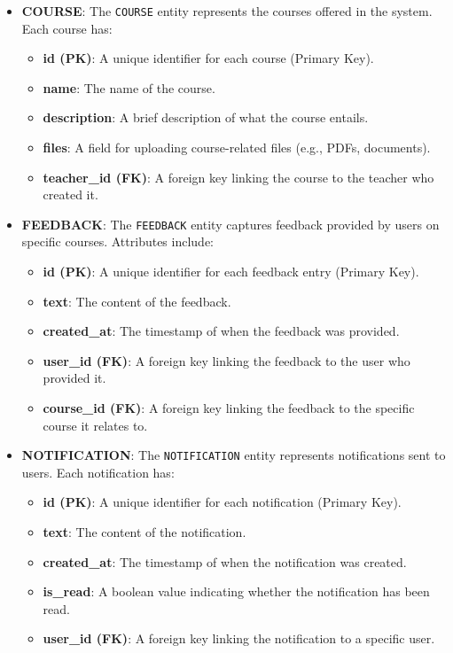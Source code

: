 \begin{itemize}
    \item \textbf{COURSE}: The \texttt{COURSE} entity represents the courses offered in the system. Each course has:
    \begin{itemize}
        \item \textbf{id (PK)}: A unique identifier for each course (Primary Key).
        \item \textbf{name}: The name of the course.
        \item \textbf{description}: A brief description of what the course entails.
        \item \textbf{files}: A field for uploading course-related files (e.g., PDFs, documents).
        \item \textbf{teacher\_id (FK)}: A foreign key linking the course to the teacher who created it.
    \end{itemize}

    \item \textbf{FEEDBACK}: The \texttt{FEEDBACK} entity captures feedback provided by users on specific courses. Attributes include:
    \begin{itemize}
        \item \textbf{id (PK)}: A unique identifier for each feedback entry (Primary Key).
        \item \textbf{text}: The content of the feedback.
        \item \textbf{created\_at}: The timestamp of when the feedback was provided.
        \item \textbf{user\_id (FK)}: A foreign key linking the feedback to the user who provided it.
        \item \textbf{course\_id (FK)}: A foreign key linking the feedback to the specific course it relates to.
    \end{itemize}

    \item \textbf{NOTIFICATION}: The \texttt{NOTIFICATION} entity represents notifications sent to users. Each notification has:
    \begin{itemize}
        \item \textbf{id (PK)}: A unique identifier for each notification (Primary Key).
        \item \textbf{text}: The content of the notification.
        \item \textbf{created\_at}: The timestamp of when the notification was created.
        \item \textbf{is\_read}: A boolean value indicating whether the notification has been read.
        \item \textbf{user\_id (FK)}: A foreign key linking the notification to a specific user.
    \end{itemize}


\end{itemize}
